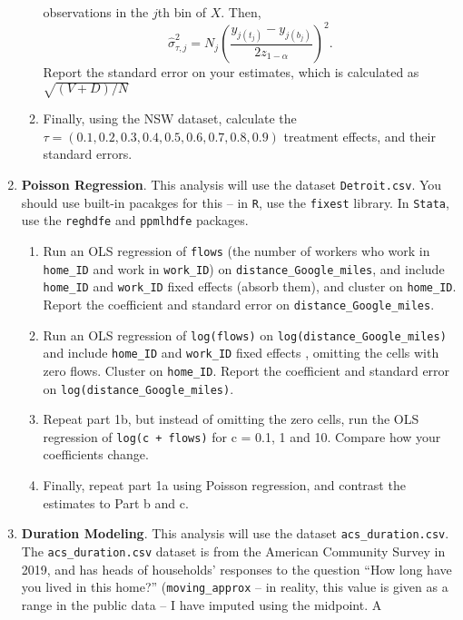 \documentclass[11pt, a4paper]{article}
\begin{document}
\begin{enumerate}
\begin{enumerate}
observations in the $j$th bin of $X$. Then,
\begin{equation}
  \hat{\sigma}^{2}_{\tau,j} = N_{j}\left(\frac{y_{j(t_{j})}-y_{j(b_{j})}}{2 z_{1-\alpha}}\right)^{2}.
\end{equation}
Report the standard error on your estimates, which is calculated as $\sqrt{(V+D)/N}$
\item Finally, using the NSW dataset, calculate the
  $\tau = (0.1,0.2,0.3,0.4,0.5,0.6,0.7,0.8,0.9)$ treatment effects, and their
  standard errors.
\end{enumerate}
\item \textbf{Poisson Regression}. This analysis will use the dataset
  \texttt{Detroit.csv}. You should use built-in pacakges for this --
  in \texttt{R}, use the \texttt{fixest} library. In \texttt{Stata},
  use the \texttt{reghdfe} and \texttt{ppmlhdfe} packages.
  \begin{enumerate}
  \item Run an OLS regression of \texttt{flows} (the number of workers
    who work in \texttt{home\_ID} and work in \texttt{work\_ID}) on
    \texttt{distance\_Google\_miles}, and include \texttt{home\_ID} and
    \texttt{work\_ID} fixed effects (absorb them), and cluster on
    \texttt{home\_ID}. Report the coefficient and standard error on
    \texttt{distance\_Google\_miles}.
  \item Run an OLS regression of \texttt{log(flows)} on
    \texttt{log(distance\_Google\_miles)} and include \texttt{home\_ID}
    and \texttt{work\_ID} fixed effects , omitting the cells with zero
    flows. Cluster on \texttt{home\_ID}. Report the coefficient and
    standard error on \texttt{log(distance\_Google\_miles)}.
  \item Repeat part 1b, but instead of omitting the zero cells, run
    the OLS regression of \texttt{log(c + flows)} for c = 0.1, 1 and
    10. Compare how your coefficients change. 
  \item Finally, repeat part 1a using Poisson regression, and contrast
    the estimates to Part b and c.
  \end{enumerate}
\item \textbf{Duration Modeling}. This analysis will use the dataset
  \texttt{acs\_duration.csv}. The
  \texttt{acs\_duration.csv} dataset is from the American Community
  Survey in 2019, and has heads of households' responses to the
  question ``How long have you lived in this home?''
  (\texttt{moving\_approx}  -- in reality, this value is given as
    a range in the public data -- I have imputed using the midpoint. A

\end{enumerate}
\end{document}
